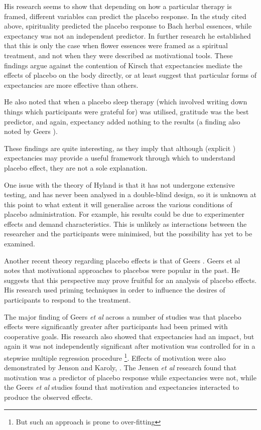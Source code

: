 His research seems to show that depending on how a particular therapy is framed, different variables can predict the placebo response.  In the study cited above, spirituality predicted the placebo response to Bach herbal essences, while expectancy was not an independent predictor. In further research \cite{Hyland2007} he established that this is only the case when flower essences were framed as a spiritual treatment, and not when they were described as motivational tools. These findings argue against the contention of Kirsch that expectancies mediate the effects of placebo on the body directly, or at least suggest that particular forms of expectancies are more effective than others. 

He also noted that when a placebo sleep therapy (which involved writing down things which participants were grateful for) was utilised, gratitude was the best predictor, and again, expectancy added nothing to the results (a finding also noted by Geers \cite{Geers2005}). 

These findings are quite interesting, as they imply that although (explicit ) expectancies may provide a useful framework through which to understand placebo effect, they are not a sole explanation. 


One issue with the theory of Hyland is that it has not undergone extensive testing, and has never been analysed in a double-blind design, so it is unknown at this point to what extent it will generalise across the various conditions of placebo administration. For example, his results could be due to experimenter effects and demand characteristics. This is  unlikely as interactions between the researcher and the participants were minimised, but the possibility has yet to be examined. 

Another recent theory regarding placebo effects is that of Geers \cite{Geers2005a}. Geers et al notes that  motivational approaches to placebos were popular in the past.  He suggests that this perspective may prove fruitful for an analysis of placebo effects.   His research used priming techniques in order to influence the desires of  participants to respond to the treatment. 

The major finding of Geers \textit{et al} across a number of studies \cite{Geers2007,Geers2005a} was that placebo effects were significantly greater after participants had been primed with cooperative goals. His research also showed that expectancies had an impact, but again it was not independently significant after motivation was controlled for in a stepwise multiple regression procedure \footnote{But such an approach is prone to over-fitting}. Effects of motivation were also demonstrated by Jenson and Karoly, \cite{Jensen1991}. The Jensen \textit{et al }   research found that motivation was a predictor of placebo response while expectancies were not, while the Geers \textit{et al } studies found that motivation and expectancies interacted to produce the observed effects.

